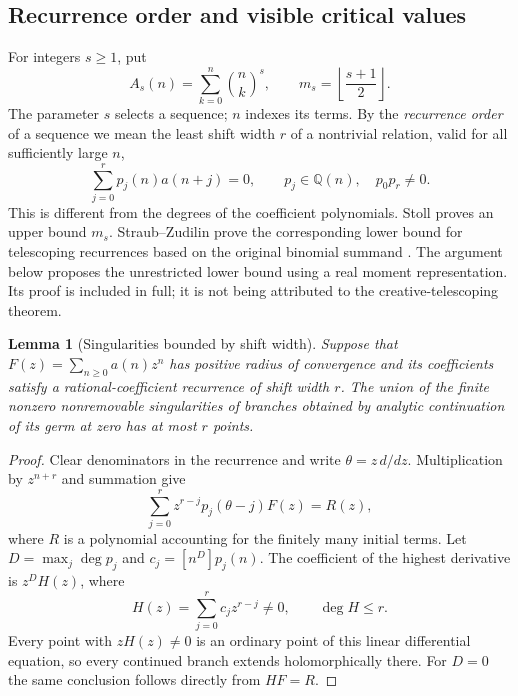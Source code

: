 \documentclass[11pt,a4paper]{article}
\newtheorem{lemma}[theorem]{Lemma}
\theoremstyle{definition}
\theoremstyle{remark}
\numberwithin{equation}{section}
\newcommand{\Q}{\mathbb Q}\newcommand{\Z}{\mathbb Z}
\begin{document}
\subsection{Recurrence order and visible critical values}
For integers $s\geq1$, put
\[
 A_s(n)=\sum_{k=0}^n\binom nk^s,\qquad
 m_s=\left\lfloor\frac{s+1}{2}\right\rfloor.
\]
The parameter $s$ selects a sequence; $n$ indexes its terms. By the
\emph{recurrence order} of a sequence we mean the least shift width $r$ of
a nontrivial relation, valid for all sufficiently large $n$,
\[
 \sum_{j=0}^r p_j(n)a(n+j)=0,
 \qquad p_j\in\Q(n),\quad p_0p_r\ne0.
\]
This is different from the degrees of the coefficient polynomials.
Stoll proves an upper bound $m_s$. Straub--Zudilin prove the corresponding
lower bound for telescoping recurrences based on the original binomial
summand \cite{R001,R002}. The argument below proposes the unrestricted
lower bound using a real moment representation. Its proof is included in
full; it is not being attributed to the creative-telescoping theorem.

\begin{lemma}[Singularities bounded by shift width]\label{A:lem:shift-singularities}
Suppose that $F(z)=\sum_{n\ge0}a(n)z^n$ has positive radius of convergence
and its coefficients satisfy a rational-coefficient recurrence of shift
width $r$. The union of the finite nonzero nonremovable singularities of
branches obtained by analytic continuation of its germ at zero has at
most $r$ points.
\end{lemma}
\begin{proof}
Clear denominators in the recurrence and write $\theta=z\,d/dz$.
Multiplication by $z^{n+r}$ and summation give
\[
 \sum_{j=0}^r z^{r-j}p_j(\theta-j)F(z)=R(z),
\]
where $R$ is a polynomial accounting for the finitely many initial terms.
Let $D=\max_j\deg p_j$ and $c_j=[n^D]p_j(n)$. The coefficient of the
highest derivative is $z^DH(z)$, where
\[
 H(z)=\sum_{j=0}^r c_jz^{r-j}\ne0,\qquad \deg H\le r.
\]
Every point with $zH(z)\ne0$ is an ordinary point of this linear
differential equation, so every continued branch extends holomorphically
there. For $D=0$ the same conclusion follows directly from $HF=R$.
\end{proof}
\end{document}
